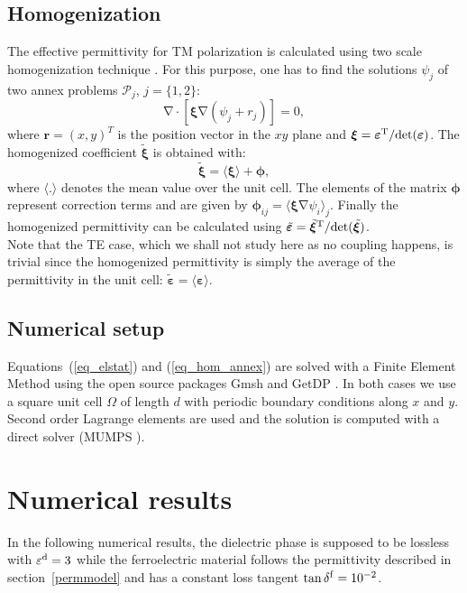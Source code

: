 \documentclass[%
 reprint,
 amsmath,amssymb,
 aps,
]{revtex4-2}
\newcommand{\B}{\boldsymbol}
\newcommand{\tens}[1]{\B{#1}}
\newcommand{\grad}{\B{\mathrm{\nabla}}}
\renewcommand{\div}{\B{\mathrm{\nabla\cdotp}}}
\newcommand{\epstens}{\tens{\varepsilon}}
\newcommand{\epsd}{\varepsilon^{\rm d}}
\newcommand{\epshom}{\tilde{\epstens}}
\newcommand{\xitens}{\tens{\xi}}
\newcommand{\xihom}{\tilde{\xitens}}
\begin{document}
\subsection*{Homogenization}
The effective permittivity for TM polarization is calculated
using two scale homogenization technique \cite{Allaire92, Guenneau2000}.
For this purpose, one has to find the solutions
$\psi_j$ of two annex problems $\mathcal P_j$, $j=\{1, 2\}$:
\begin{equation}
\div \left[ \xitens \grad(\psi_j + r_j) \right] = 0,
\label{eq_hom_annex}
\end{equation}
where $\B r = (x, y)^T$ is the position vector in the $xy$ plane and
$\xitens=\epstens^{\rm T}/ {\rm det }(\epstens)$.
The homogenized coefficient $\xihom$ is obtained with:
\begin{equation}
\xihom = \langle \xitens \rangle + \B \phi,
\label{eq_hom}
\end{equation}
where $\langle . \rangle$ denotes the mean value over the unit cell.
The elements of the matrix $\B \phi$ represent correction terms and
are given by $\B \phi_{ij} = \langle \xitens \grad \psi_i \rangle_j$.
Finally the homogenized permittivity  can be calculated using $\epshom=\xihom^{\rm T}/ {\rm det }(\xihom)$.\\
Note that the TE case, which we shall not study here as no coupling happens, is trivial since
the homogenized permittivity is simply the average of the permittivity in the unit cell:
$\epshom = \langle \epstens \rangle$.


\subsection*{Numerical setup}
Equations~(\ref{eq_elstat}) and (\ref{eq_hom_annex}) are solved with a Finite Element
Method using the open source packages Gmsh \cite{gmsh} and GetDP \cite{getdp}.
In both cases we use a square unit cell $\Omega$ of length $d$ with periodic boundary
conditions along $x$ and $y$. Second order Lagrange elements are used and the
solution is computed with a direct solver (MUMPS \cite{MUMPS}).



\section*{Numerical results}
In the following numerical results, the dielectric phase is supposed to be
lossless with $\epsd = 3$ while the ferroelectric material follows the
permittivity described in section~\ref{permmodel} and has a constant loss
tangent $\tan \delta^{\rm f} = 10^{-2}$.
\end{document}
